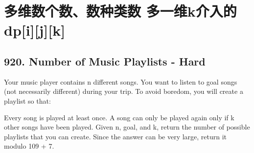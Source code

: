 \documentclass[9pt, b5paaper]{book}
\begin{document}
\section{多维数个数、数种类数 多一维k介入的 dp[i][j][k]}
\label{sec-1-5}
\subsection{920. Number of Music Playlists - Hard}
\label{sec-1-5-1}
Your music player contains n different songs. You want to listen to goal songs (not necessarily different) during your trip. To avoid boredom, you will create a playlist so that:

Every song is played at least once.
A song can only be played again only if k other songs have been played.
Given n, goal, and k, return the number of possible playlists that you can create. Since the answer can be very large, return it modulo 109 + 7.
\end{document}
